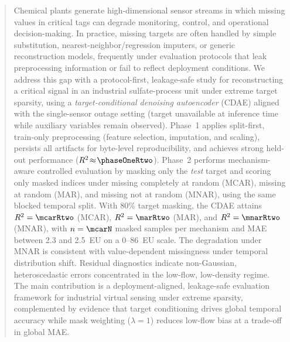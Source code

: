 \begin{abstract}
    Chemical plants generate high-dimensional sensor streams in which missing values in critical tags can degrade monitoring, control, and operational decision-making. In practice, missing targets are often handled by simple substitution, nearest-neighbor/regression imputers, or generic reconstruction models, frequently under evaluation protocols that leak preprocessing information or fail to reflect deployment conditions. We address this gap with a protocol-first, leakage-safe study for reconstructing a critical signal in an industrial sulfate-process unit under extreme target sparsity, using a \emph{target-conditional denoising autoencoder} (CDAE) aligned with the single-sensor outage setting (target unavailable at inference time while auxiliary variables remain observed). Phase~1 applies split-first, train-only preprocessing (feature selection, imputation, and scaling), persists all artifacts for byte-level reproducibility, and achieves strong held-out performance ($R^2\!\approx\!\phaseOneRtwo$). Phase~2 performs mechanism-aware controlled evaluation by masking only the \emph{test} target and scoring only masked indices under missing completely at random (MCAR), missing at random (MAR), and missing not at random (MNAR), using the same blocked temporal split. With 80\% target masking, the CDAE attains $R^2=\mcarRtwo$ (MCAR), $R^2=\marRtwo$ (MAR), and $R^2=\mnarRtwo$ (MNAR), with $n=\mcarN$ masked samples per mechanism and MAE between 2.3 and 2.5~EU on a 0--86~EU scale. The degradation under MNAR is consistent with value-dependent missingness under temporal distribution shift. Residual diagnostics indicate non-Gaussian, heteroscedastic errors concentrated in the low-flow, low-density regime. The main contribution is a deployment-aligned, leakage-safe evaluation framework for industrial virtual sensing under extreme sparsity, complemented by evidence that target conditioning drives global temporal accuracy while mask weighting ($\lambda{=}1$) reduces low-flow bias at a trade-off in global MAE.
    \end{abstract}